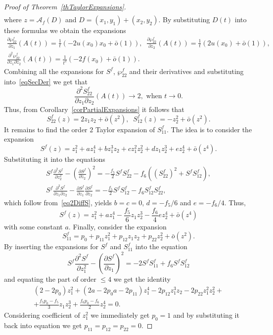 \documentclass{amsart}
\numberwithin{equation}{section}
\theoremstyle{definition}
\theoremstyle{remark}
\begin{document}
\begin{proof}[Proof of Theorem~\ref{thTaylorExpansions}]
\[\begin{gathered}
		\end{gathered}
		\]
		where $z = \mathscr A_f(D)$ and $D = (x_1,y_1) + (x_2,y_2)$. By substituting $D(t)$ into these formulas we obtain the expansions
		\[
		\begin{gathered}
			\frac{\partial \wp_{22}^f}{\partial z_1}(A(t)) = \frac{1}{t}(-2u(x_0)x_0 + \bar{o}(1)),\;\;\frac{\partial \wp_{22}^f}{\partial z_2}(A(t)) = \frac{1}{t}(2u(x_0) + \bar{o}(1)),\\
			\frac{\partial^2 \wp_{22}^f}{\partial z_1 \partial z_2}(A(t)) = \frac{1}{t^2}(-2f(x_0) + \bar{o}(1)).
		\end{gathered}
		\]
		Combining all the expansions for $S^f$, $\wp_{22}^f$ and their derivatives and substituting into~\eqref{eqSecDer} we get that
		\[
		\frac{\partial^2 S_{22}^f}{\partial z_1 \partial z_2}(A(t)) \to 2,\text{ when }t \to 0.
		\]
		Thus, from Corollary~\ref{corPartialExpansions} it follows that
		\[
		S_{22}^f(z) = 2z_1z_2 + \bar{o}(z^2),\;\;S_{12}^f(z) = -z_2^2 + \bar{o}(z^2).
		\]
		It remains to find the order $2$ Taylor expansion of $S_{11}^f$. The idea is to consider the expansion
		\[
		S^f(z) = z_1^2 + az_1^4 + bz_1^3z_2 + cz_1^2z_2^2 + dz_1z_2^3 + ez_2^4 + \bar{o}(z^4).
		\]
		Substituting it into the equations
		\[
		\begin{gathered}
			S^f\frac{\partial^2 S^f}{\partial z_2^2} - \left(\frac{\partial S^f}{\partial z_2}\right)^2 = -\frac{f_5}{2}S^fS^f_{22}  - f_6\left(\left(S_{22}^f\right)^2 + S^fS_{12}^f\right), \\
			S^f\frac{\partial^2 S^f}{\partial z_1 \partial z_2} - \frac{\partial S^f}{\partial z_1}\frac{\partial S^f}{\partial z_2} = -\frac{f_5}{2}S^fS^f_{12}  - f_6S_{12}^fS_{22}^f,
		\end{gathered}
		\]
		which follow from~\eqref{eq2DiffS}, yields $b = c = 0$, $d = -f_5/6$ and $e = -f_6/4$. Thus,
		\[
		S^f(z) = z_1^2 + az_1^4 - \frac{f_5}{6}z_1z_2^3 - \frac{f_6}{4} ez_2^4 + \bar{o}(z^4)
		\]
		with some constant $a$. Finally, consider the expansion
		\[
		S_{11}^f = p_0 + p_{11}z_1^2 + p_{12}z_1z_2 + p_{22}z_2^2 + \bar{o}(z^2).
		\]
		By inserting the expansions for $S^f$ and $S_{11}^f$ into the equation
		\[
		S^f\frac{\partial^2 S^f}{\partial z_1^2} - \left(\frac{\partial S^f}{\partial z_1}\right)^2 = -2S^fS^f_{11}  + f_6S^fS_{12}^f
		\]
		and equating the part of order $\le 4$ we get the identity
		\begin{multline*}
		(2 - 2p_0)z_1^2 + (2a - 2p_0a - 2p_{11})z_1^4 - 2p_{12}z_1^3z_2 - 2p_{22}z_1^2z_2^2 + \\+ \frac{f_5 p_0 - f_5}{3}z_1 z_2^3 + \frac{f_6p_0 - f_6}{2}z_2^4 = 0.
		\end{multline*}
		Considering coefficient of $z_1^2$ we immediately get $p_0 = 1$ and by substituting it back into equation we get $p_{11} = p_{12} = p_{22} = 0$.
		
		
	\end{proof}

    \printbibliography
\end{document}
